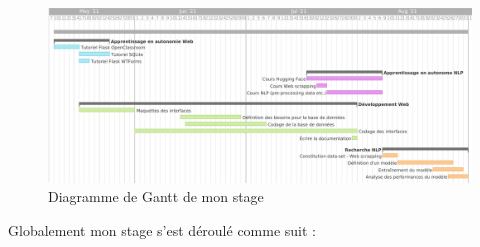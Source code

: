 \documentclass[12pt]{article}
\begin{document}
\begin{figure}[h]
    \centering
    \includegraphics[scale=0.35]{gantt.png}
    \caption{Diagramme de Gantt de mon stage}
    \label{fig:gantt}
\end{figure}

Globalement mon stage s'est déroulé comme suit :
\end{document}
